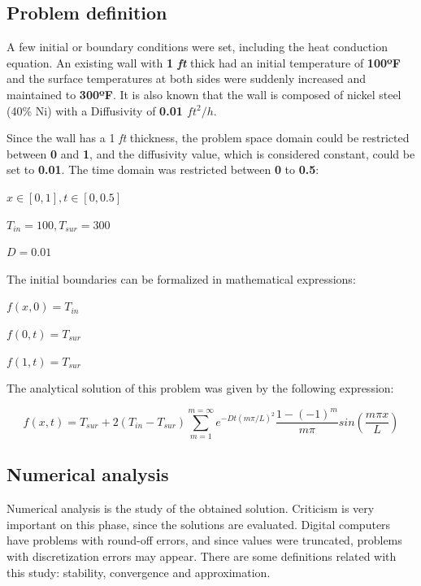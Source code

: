 \documentclass[12pt]{report}
\begin{document}
\subsection*{Problem definition}
A few initial or boundary conditions were set, including the heat conduction equation. An existing wall with \textbf{1 \textit{ft}} thick had an initial temperature of \textbf{100ºF} and the surface temperatures at both sides were suddenly increased and maintained to \textbf{300ºF}. It is also known that the wall is composed of nickel steel (40\% Ni) with a Diffusivity of \textbf{0.01 $ft ^2/h$}.
\par
Since the wall has a 1 \textit{ft} thickness, the problem space domain could be restricted between \textbf{0} and \textbf{1}, and the diffusivity value, which is considered constant, could be set to \textbf{0.01}. The time domain was restricted between \textbf{0} to \textbf{0.5}:
\begin{center}
\normalsize
$
x \in [0, 1], t \in [0, 0.5]
$
\end{center}
\begin{center}
\normalsize
$
T_{in} = 100, T_{sur} = 300
$
\end{center}
\begin{center}
\normalsize
$
D = 0.01
$
\end{center}
\par 
The initial boundaries can be formalized in mathematical expressions:
\begin{center}
\normalsize
$
f(x,0) = T_{in}
$
\end{center}
\begin{center}
\normalsize
$
f(0,t) = T_{sur}
$
\end{center}
\begin{center}
\normalsize
$
f(1,t) = T_{sur}
$
\end{center}
\par
The analytical solution of this problem was given by the following expression:
\begin{center}
\normalsize
$$
f(x,t) = T_{sur} + 2(T_{in} - T_{sur}) \sum_{m=1}^{m=\infty} 
e ^{-D t (m \pi / L) ^2}  \frac{1 - (-1)^m}{m \pi} sin \left(\frac{m \pi x}{L}\right)$$  

\end{center}

\subsection*{Numerical analysis}
\par Numerical analysis is the study of the obtained solution. Criticism is very important on this phase, since the solutions are evaluated. Digital computers have problems with round-off errors, and since values were truncated, problems with discretization errors may appear. There are some definitions related with this study: stability, convergence and approximation.
\end{document}
